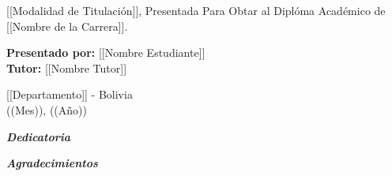\documentclass[
  12pt,                       %
  letterpapper,               %
  twoside,                    %
  openright                   %
]{book}                       %
\newenvironment{abstract}
  {
    \null\vfill
    \begin{center}
      \bfseries\MakeUppercase\abstractname
    \end{center}
  }
  {
    \vfill\null
  }
\begin{document}
\begin{titlepage}
  \vspace{.1\textheight}

  \begin{center}
    \Large
    [[Modalidad de Titulación]], Presentada Para Obtar al Diplóma Académico de [[Nombre de la Carrera]].
  \end{center}

  \vspace{12pt}

  \begin{center}
    \parbox[c]{.8\textwidth}{
      \large
      \textbf{Presentado por:} [[Nombre Estudiante]] \\
      \textbf{Tutor:} [[Nombre Tutor]] \\
    }
  \end{center}

  \null\vspace{.1\textheight}

  {\centering\Large
    [[Departamento]] - Bolivia \\
    ((Mes)), ((Año))
    \par
  }
\end{titlepage}

\frontmatter    %

\begin{flushright}
    \null{}
        \textit{\textbf{Dedicatoria}} \\
        
    \null
\end{flushright}
\cleardoublepage

\begin{flushright}
    \null{}
        \textit{\textbf{Agradecimientos}} \\
        
    \null
\end{flushright}
\cleardoublepage

\onehalfspace
{}
\begin{abstract}
    
\end{abstract}
\end{document}
